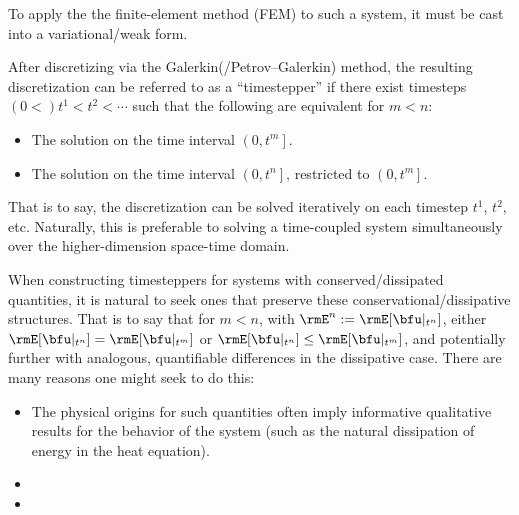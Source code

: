     To apply the the finite-element method (FEM) to such a system, it must be cast into a variational/weak form.
    
    After discretizing via the Galerkin(/Petrov–Galerkin) method, the resulting discretization can be referred to as a ``timestepper'' if there exist timesteps $(0  <)  t^{1}  <  t^{2}  <  \cdots$ such that the following are equivalent for $m  <  n$:
    \begin{itemize}
        \item  The solution on the time interval $\left(0, t^{m}\right]$.
        \item  The solution on the time interval $\left(0, t^{n}\right]$, restricted to $\left(0, t^{m}\right]$.
    \end{itemize}
    That is to say, the discretization can be solved iteratively on each timestep $t^{1}$, $t^{2}$, etc. Naturally, this is preferable to solving a time-coupled system simultaneously over the higher-dimension space-time domain.
    
    When constructing timesteppers for systems with conserved/dissipated quantities, it is natural to seek ones that preserve these conservational/dissipative structures. That is to say that for $m  <  n$, with $\rmE^{n}  :=  \rmE[\bfu|_{t^{n}}]$, either $\rmE[\bfu|_{t^{n}}]  =  \rmE[\bfu|_{t^{m}}]$ or $\rmE[\bfu|_{t^{n}}]  \leq  \rmE[\bfu|_{t^{m}}]$, and potentially further with analogous, quantifiable differences in the dissipative case. There are many reasons one might seek to do this:
    \begin{itemize}
        \item  The physical origins for such quantities often imply informative qualitative results for the behavior of the system (such as the natural dissipation of energy in the heat equation). 
        \item  {}
        \item  {}
    \end{itemize}



    
    
